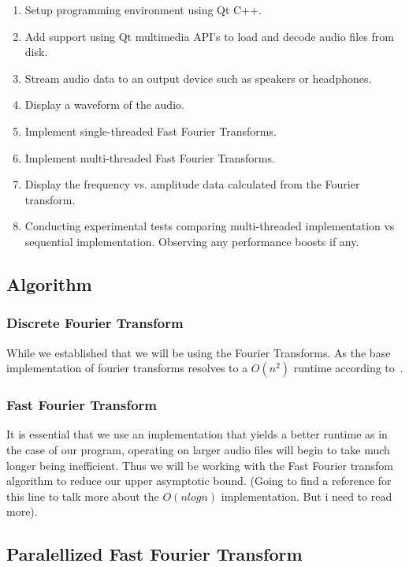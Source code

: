 \documentclass[journal]{IEEEtran}
\begin{document}
\begin{enumerate}
	\item Setup programming environment using Qt C++.
	\item Add support using Qt multimedia API's to load and decode audio files from disk.
	\item Stream audio data to an output device such as speakers or headphones.
	\item Display a waveform of the audio.
	\item Implement single-threaded Fast Fourier Transforms.
	\item Implement multi-threaded Fast Fourier Transforms.
	\item Display the frequency vs. amplitude data calculated from the Fourier transform.
	\item Conducting experimental tests comparing multi-threaded implementation vs sequential implementation. 
Observing any performance boosts if any.
\end{enumerate}

\subsection{Algorithm}
	 
\subsubsection{Discrete Fourier Transform}
	\par While we established that we will be using the Fourier Transforms. As the base implementation of fourier transforms resolves to a $O(n^2)$ runtime according to~\cite{Xie}.
\subsubsection{Fast Fourier Transform}
	\par It is essential that we use an implementation that yields a better runtime as in the case of our program, operating on larger audio files will begin to take much longer being inefficient. Thus we will be working with the Fast Fourier transfom algorithm to reduce our upper asymptotic bound.  (Going to find a reference for this line to talk more about the $O(nlog{}n)$ implementation. But i need to read more).
\subsection{Paralellized Fast Fourier Transform}
\end{document}
